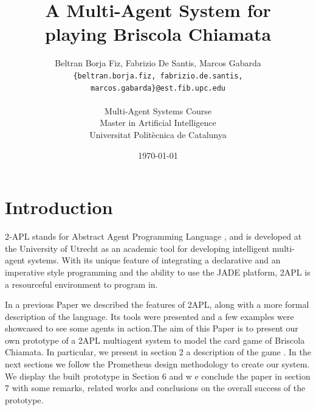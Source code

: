 \documentclass[a4paper]{article}
\begin{document}
\title{A Multi-Agent System for\\ playing Briscola Chiamata}
 
\author{Beltran Borja Fiz, Fabrizio De Santis, Marcos Gabarda\\
\small \texttt{\{beltran.borja.fiz, fabrizio.de.santis, marcos.gabarda\}@est.fib.upc.edu}\\
\\
Multi-Agent Systems Course\\
Master in Artificial Intelligence\\
Universitat Polit\`ecnica de Catalunya}
\date{\today}

\newenvironment{fminipage}%
  {\begin{Sbox}\begin{minipage}}%
  {\end{minipage}\end{Sbox}\fbox{\TheSbox}}


\maketitle

\tableofcontents

\newpage

\section{Introduction}\label{sec:intro}

2-APL stands for Abstract Agent Programming Language , and is developed at the University of Utrecht as an academic tool for developing intelligent multi-agent systems. With its unique feature of integrating a declarative and an imperative style programming and the ability to use the JADE platform, 2APL is a resourceful environment to program in.

In a previous Paper we described the features of 2APL, along with a more formal description of the language. Its tools were presented and a few examples were showcased to see some agents in action.The aim of this Paper is to present our own prototype of a 2APL multiagent system to model the card game of Briscola Chiamata. In particular, we present in section 2 a description of the game . In the next sections we follow the Prometheus design methodology to create our system. We display the built prototype in Section 6 and w e conclude the paper in section 7 with some remarks, related works and conclusions on the overall success of the prototype.
\end{document}
